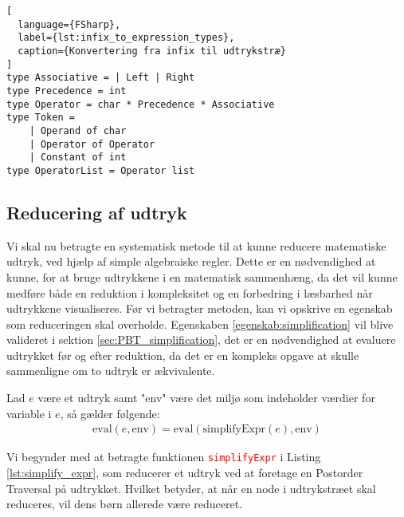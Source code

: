 \begin{lstlisting}[
  language={FSharp}, 
  label={lst:infix_to_expression_types}, 
  caption={Konvertering fra infix til udtrykstræ}
]
type Associative = | Left | Right
type Precedence = int
type Operator = char * Precedence * Associative
type Token =
    | Operand of char
    | Operator of Operator
    | Constant of int
type OperatorList = Operator list
\end{lstlisting}




\subsection{Reducering af udtryk} \label{sec:simplification_expression}
Vi skal nu betragte en systematisk metode til at kunne reducere matematiske udtryk, ved hjælp af simple algebraiske regler. Dette er en nødvendighed at kunne, for at bruge udtrykkene i en matematisk sammenhæng, da det vil kunne medføre både en reduktion i kompleksitet og en forbedring i læsbarhed når udtrykkene visualiseres. Før vi betragter metoden, kan vi opskrive en egenskab som reduceringen skal overholde. Egenskaben \ref{egenskab:simplification} vil blive valideret i sektion \ref{sec:PBT_simplification}, det er en nødvendighed at evaluere udtrykket før og efter reduktion, da det er en kompleks opgave at skulle sammenligne om to udtryk er ækvivalente.
\vspace{0.5cm}
\begin{egenskab}\label{egenskab:simplification}
Lad $e$ være et udtryk samt "env" være det miljø som indeholder værdier for variable i $e$, så gælder følgende:
\begin{align*}
  \text{eval}(e, \text{env}) = \text{eval}(\text{simplifyExpr}(e), \text{env})
\end{align*}
\end{egenskab}  

Vi begynder med at betragte funktionen \textcolor{red}{\texttt{simplifyExpr}} i Listing \ref{lst:simplify_expr}, som reducerer et udtryk ved at foretage en Postorder Traversal på udtrykket. Hvilket betyder, at når en node i udtrykstræet skal reduceres, vil dens børn allerede være reduceret. 


